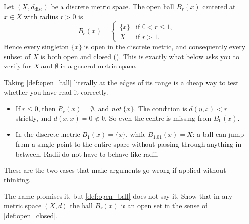 \begin{aiexample}
Let $(X, d_{\text{disc}})$ be a discrete metric space. The open ball $B_r(x)$ centered at
$x \in X$ with radius $r > 0$ is
\[
B_r(x) = \begin{cases} \{x\} & \text{if } 0 < r \leq 1, \\ X & \text{if } r > 1. \end{cases}
\]
Hence every singleton $\{x\}$ is open in the discrete metric, and consequently every subset of
$X$ is both open and closed (). This is exactly what 
below asks you to verify for $X$ and $\emptyset$ in a general metric space.
\end{aiexample}

\begin{remark}
Taking \cref{def:open_ball} literally at the edges of its range is a cheap way to test whether
you have read it correctly.
\begin{itemize}
  \item If $r \leq 0$, then $B_r(x) = \emptyset$, and \emph{not} $\{x\}$. The condition is
    $d(y,x) < r$, strictly, and $d(x,x) = 0 \not< 0$. So even the centre is missing from
    $B_0(x)$.
  \item In the discrete metric $B_1(x) = \{x\}$, while $B_{1.01}(x) = X$: a ball can jump from a
    single point to the entire space without passing through anything in between. Radii do not
    have to behave like radii.
\end{itemize}
These are the two cases that make  arguments go wrong if applied
without thinking.
\end{remark}

\begin{aiexercise}
\label{ex:ai_open_balls_are_open}
The name promises it, but \cref{def:open_ball} does not say it. Show that in any metric space
$(X,d)$ the ball $B_r(x)$ is an open set in the sense of \cref{def:open_closed}.

\end{aiexercise}

